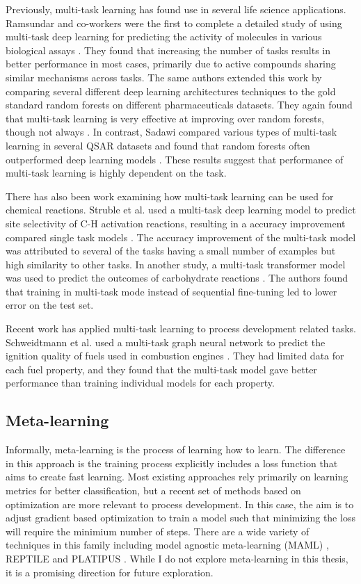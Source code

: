 Previously, multi-task learning has found use in several life science applications. Ramsundar and co-workers were the first to complete a detailed study of using multi-task deep learning for predicting the activity of molecules in various biological assays \cite{Ramsundar2015}. They found that increasing the number of tasks results in better performance in most cases, primarily due to active compounds sharing similar mechanisms across tasks. The same authors extended this work by comparing several different deep learning architectures techniques to the gold standard random forests on different pharmaceuticals datasets. They again found that multi-task learning is very effective at improving over random forests, though not always \cite{Ramsundar2017}. In contrast, Sadawi compared various types of multi-task learning in several QSAR datasets and found that random forests often outperformed deep learning models \cite{Sadawi2019}. These results suggest that performance of multi-task learning is highly dependent on the task.

There has also been work examining how multi-task learning can be used for chemical reactions. Struble et al. used a multi-task deep learning model to predict site selectivity of C-H activation reactions, resulting in a accuracy improvement compared single task models \cite{Struble2020}. The accuracy improvement of the multi-task model was attributed to several of the tasks having a small number of examples but high similarity to other tasks. In another study, a multi-task transformer model was used to predict the outcomes of carbohydrate reactions \cite{Pesciullesi2020}. The authors found that training in multi-task mode instead of sequential fine-tuning led to lower error on the test set. 

Recent work has applied multi-task learning to process development related tasks. Schweidtmann et al. used a multi-task graph neural network to predict the ignition quality of fuels used in combustion engines \cite{Schweidtmann2020,Schweidtmann2020}. They had limited data for each fuel property, and they found that the multi-task model gave better performance than training individual models for each property. 

\subsection{Meta-learning}

Informally, meta-learning is the process of learning how to learn. The difference in this approach is the training process explicitly includes a loss function that aims to create fast learning. Most existing approaches rely primarily on learning metrics for better classification, but a recent set of methods based on optimization are more relevant to process development. 
In this case, the aim is to adjust gradient based optimization to train a model such that minimizing the loss will require the minimium number of steps. There are a wide variety of techniques in this family including model agnostic meta-learning (MAML) \cite{Finn2017}, REPTILE \cite{Nichols2018} and PLATIPUS \cite{Finn2018}. While I do not explore meta-learning in this thesis, it is a promising direction for future exploration.

